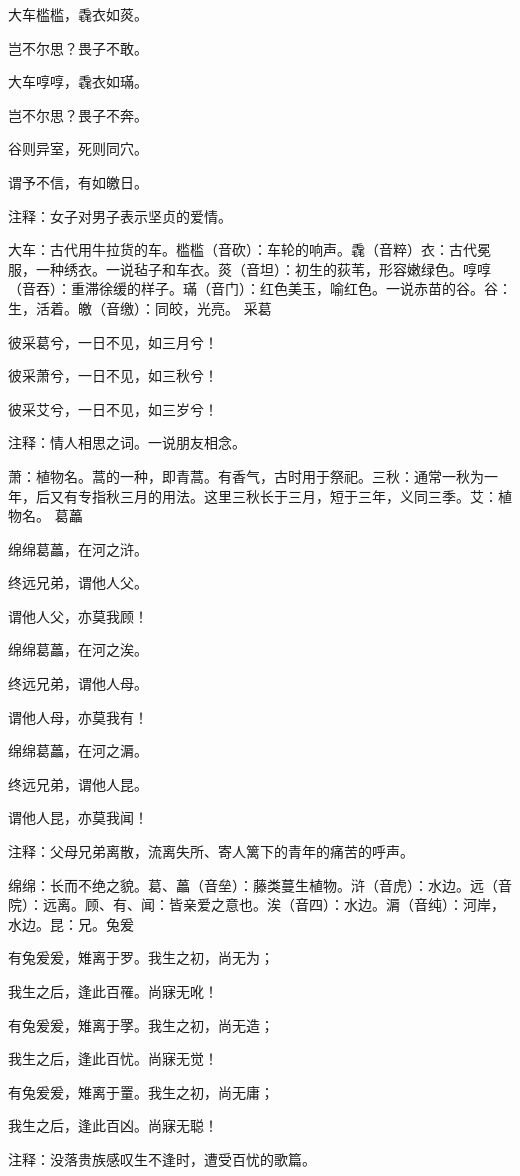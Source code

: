 \documentclass[12pt,UTF8]{ctexbook}
\begin{document}
大车槛槛，毳衣如菼。

岂不尔思？畏子不敢。

大车啍啍，毳衣如璊。

岂不尔思？畏子不奔。

谷则异室，死则同穴。

谓予不信，有如皦日。

注释：女子对男子表示坚贞的爱情。

大车：古代用牛拉货的车。槛槛（音砍）：车轮的响声。毳（音粹）衣：古代冕服，一种绣衣。一说毡子和车衣。菼（音坦）：初生的荻苇，形容嫩绿色。啍啍（音吞）：重滞徐缓的样子。璊（音门）：红色美玉，喻红色。一说赤苗的谷。谷：生，活着。皦（音缴）：同皎，光亮。 采葛

彼采葛兮，一日不见，如三月兮！

彼采萧兮，一日不见，如三秋兮！

彼采艾兮，一日不见，如三岁兮！

注释：情人相思之词。一说朋友相念。

萧：植物名。蒿的一种，即青蒿。有香气，古时用于祭祀。三秋：通常一秋为一年，后又有专指秋三月的用法。这里三秋长于三月，短于三年，义同三季。艾：植物名。 葛藟

绵绵葛藟，在河之浒。

终远兄弟，谓他人父。

谓他人父，亦莫我顾！

绵绵葛藟，在河之涘。

终远兄弟，谓他人母。

谓他人母，亦莫我有！

绵绵葛藟，在河之漘。

终远兄弟，谓他人昆。

谓他人昆，亦莫我闻！

注释：父母兄弟离散，流离失所、寄人篱下的青年的痛苦的呼声。

绵绵：长而不绝之貌。葛、藟（音垒）：藤类蔓生植物。浒（音虎）：水边。远（音院）：远离。顾、有、闻：皆亲爱之意也。涘（音四）：水边。漘（音纯）：河岸，水边。昆：兄。兔爰

有兔爰爰，雉离于罗。我生之初，尚无为；

我生之后，逢此百罹。尚寐无吪！

有兔爰爰，雉离于罦。我生之初，尚无造；

我生之后，逢此百忧。尚寐无觉！

有兔爰爰，雉离于罿。我生之初，尚无庸；

我生之后，逢此百凶。尚寐无聪！

注释：没落贵族感叹生不逢时，遭受百忧的歌篇。
\end{document}
